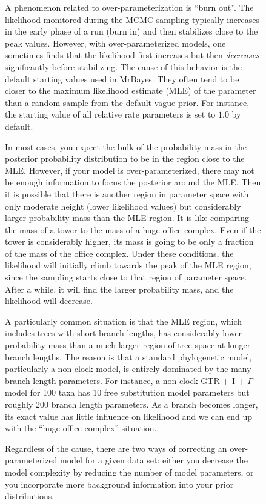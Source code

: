 \documentclass[12pt]{book}
\begin{document}
\begin{figure}[h]
A phenomenon related to over-parameterization is ``burn out''. The likelihood monitored during the
MCMC sampling typically increases in the early phase of a run (burn in) and then stabilizes close
to the peak values. However, with over-parameterized models, one sometimes finds that the
likelihood first increases but then \emph{decreases} significantly before stabilizing. The cause of
this behavior is the default starting values used in MrBayes. They often tend to be closer to the
maximum likelihood estimate (MLE) of the parameter than a random sample from the default vague
prior. For instance, the starting value of all relative rate parameters is set to $1.0$ by default.

In most cases, you expect the bulk of the probability mass in the posterior probability
distribution to be in the region close to the MLE. However, if your model is over-parameterized,
there may not be enough information to focus the posterior around the MLE. Then it is possible that
there is another region in parameter space with only moderate height (lower likelihood values) but
considerably larger probability mass than the MLE region. It is like comparing the mass of a tower
to the mass of a huge office complex. Even if the tower is considerably higher, its mass is going
to be only a fraction of the mass of the office complex. Under these conditions, the likelihood
will initially climb towards the peak of the MLE region, since the sampling starts close to that
region of parameter space. After a while, it will find the larger probability mass, and the
likelihood will decrease.

A particularly common situation is that the MLE region, which includes trees with short branch
lengths, has considerably lower probability mass than a much larger region of tree space at longer
branch lengths. The reason is that a standard phylogenetic model, particularly a non-clock model,
is entirely dominated by the many branch length parameters. For instance, a non-clock GTR + I +
$\Gamma$ model for 100 taxa has 10 free substitution model parameters but roughly 200 branch length
parameters. As a branch becomes longer, its exact value has little influence on likelihood and we
can end up with the ``huge office complex'' situation.

Regardless of the cause, there are two ways of correcting an over-parameterized model for a given
data set: either you decrease the model complexity by reducing the number of model parameters, or
you incorporate more background information into your prior distributions.


\end{figure}
\end{document}
